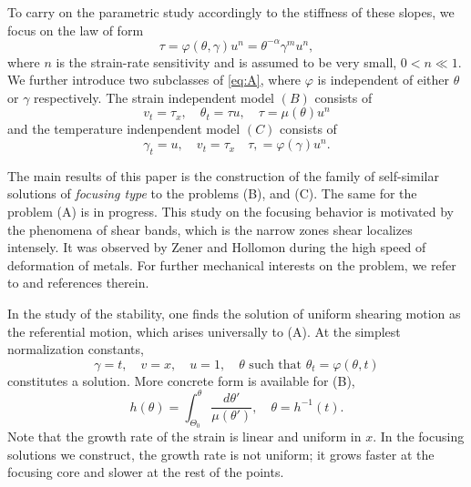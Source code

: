 \documentclass[graybox]{svmult}
\begin{document}
To carry on the parametric study accordingly to the stiffness of these slopes, we focus on the law of form
\begin{equation}
 \tau = \varphi(\theta,\gamma)u^n = \theta^{-\alpha}\gamma^m u^n, \label{eq:power} 
\end{equation}
where $n$ is the strain-rate sensitivity and is assumed to be very small, $0<n\ll1$. We further introduce two subclasses of \eqref{eq:A}, where $\varphi$ is independent of either $\theta$ or $\gamma$ respectively.
The strain independent model $(B)$ consists of 
\begin{equation} \label{eq:B}\tag{B}
 v_t = \tau_x, \quad \theta_t = \tau u, \quad \tau = \mu(\theta)u^n 		
\end{equation}
and the temperature indenpendent model $(C)$ consists of
\begin{equation} \label{eq:C}\tag{C}
 \gamma_t = u, \quad  v_t = \tau_x \quad \tau, = \varphi(\gamma)u^n.			
\end{equation}

The main results of this paper is the construction of the family of self-similar solutions of {\it focusing type} to the problems (B), and (C). The same for the problem (A) is in progress. This study on the focusing behavior is motivated by the phenomena of shear bands, which is the narrow zones shear localizes intensely. It was observed by Zener and Hollomon \cite{ZH_1944} during the high speed of deformation of metals. For further mechanical interests on the problem, we refer to \cite{FM87, SC89} and references therein. %

In the study of the stability, one finds the solution of uniform shearing motion as the referential motion, which arises universally to (A). At the simplest normalization constants, 
$$ \gamma = t, \quad v=x, \quad u=1, \quad \text{$\theta$ such that $\theta_t = \varphi(\theta,t)$}$$
constitutes a solution. More concrete form is available for (B),
$$ h(\theta) = \int_{\Theta_0}^\theta \frac{d\theta'}{\mu(\theta')}, \quad \theta = h^{-1}(t).$$
Note that the growth rate of the strain is linear and uniform in $x$. In the focusing solutions we construct, the growth rate is not uniform; it grows faster at the focusing core and slower at the rest of the points.
\end{document}
